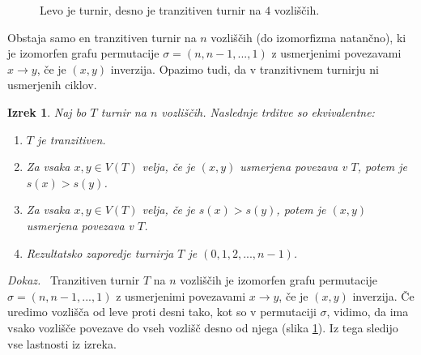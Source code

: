\documentclass[a4paper, 12pt]{book}
\newtheorem{izrek}{Izrek}[chapter]
\newenvironment{dokaz}{\emph{Dokaz.}\ }{\hspace{\fill}{$\Box$}}
\begin{document}
\begin{figure}[h]
    \begin{center}        
    \end{center}
    \caption{Levo je turnir, desno je tranzitiven turnir na $4$ vozliščih.}
    \label{graf_turnirja_in_tranzitivnega_turnirja}
\end{figure}

Obstaja samo en tranzitiven turnir na $n$ vozliščih (do izomorfizma natančno), ki je izomorfen grafu permutacije $\sigma = (n, n-1, ..., 1)$ z usmerjenimi povezavami $x \rightarrow y$, če je $(x, y)$ inverzija. Opazimo tudi, da v tranzitivnem turnirju ni usmerjenih ciklov. 

\begin{izrek}
\label{izrek_tranzitiven_turnir}
    Naj bo $T$ turnir na $n$ vozliščih. Naslednje trditve so ekvivalentne:
    \begin{enumerate}
        \item $T$ je tranzitiven.
        \item Za vsaka $x,y \in V(T)$ velja, če je $(x, y)$ usmerjena povezava v $T$, potem je $s(x) > s(y)$.
        \item Za vsaka $x,y \in V(T)$  velja, če je $s(x) > s(y)$, potem je $(x, y)$ usmerjena povezava v $T$.
        \item Rezultatsko zaporedje turnirja $T$ je $(0, 1, 2, ..., n-1)$.
    \end{enumerate}
\end{izrek}
\begin{dokaz}
    Tranzitiven turnir $T$ na $n$ vozliščih je izomorfen grafu permutacije $\sigma = (n, n-1, ..., 1)$ z usmerjenimi povezavami $x \rightarrow y$, če je $(x, y)$ inverzija. Če uredimo vozlišča od leve proti desni tako, kot so v permutaciji $\sigma$, vidimo, da ima vsako vozlišče povezave do vseh vozlišč desno od njega (slika \ref{graf_turnirja_in_tranzitivnega_turnirja}). Iz tega sledijo vse lastnosti iz izreka.
\end{dokaz}
\end{document}

